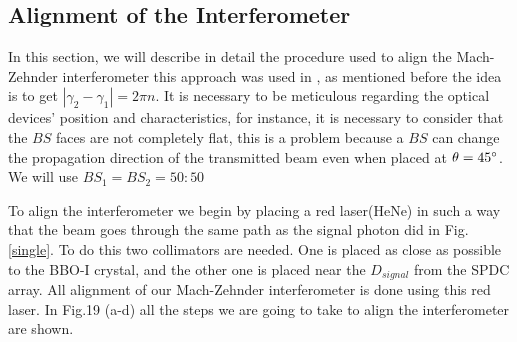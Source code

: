 \documentclass[12pt]{book}
\begin{document}
\subsection{Alignment of the Interferometer}

In this section, we will describe in detail the procedure used to align the Mach-Zehnder interferometer this approach was used in \cite{zuri}, as mentioned before the idea is to get $|\gamma_{2}-\gamma_{1}|=2\pi n$. It is necessary to be meticulous regarding the optical devices' position and characteristics, for instance, it is necessary to consider that the $BS$ faces are not completely flat, this is a problem because a $BS$ can change the propagation direction of the transmitted beam even when placed at $\theta=45\degree$. We will use $BS_{1}=BS_{2}=50:50$

To align the interferometer we begin by placing a red laser(HeNe) in such a way that the beam goes through the same path as the signal photon did in Fig. \ref{single}. To do this two collimators are needed. One is placed as close as possible to the BBO-I crystal, and the other one is placed near the $D_{signal}$ from the SPDC array. All alignment of our Mach-Zehnder interferometer is done using this red laser. In Fig.19 (a-d) all the steps we are going to take to align the interferometer are shown.
\end{document}
